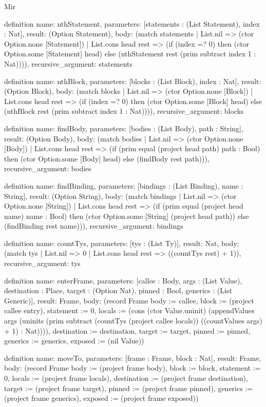 \begin{lexlean}{Mir}
\begin{semanticmodule}
definition{
  name: nthStatement,
  parameters: [statements : (List Statement), index : Nat],
  result: (Option Statement),
  body: (match statements
    | List.nil => (ctor Option.none [Statement])
    | List.cons head rest => (if (index =? 0) then (ctor Option.some [Statement] head) else (nthStatement rest (prim subtract index 1 : Nat)))),
  recursive_argument: statements
}

definition{
  name: nthBlock,
  parameters: [blocks : (List Block), index : Nat],
  result: (Option Block),
  body: (match blocks
    | List.nil => (ctor Option.none [Block])
    | List.cons head rest => (if (index =? 0) then (ctor Option.some [Block] head) else (nthBlock rest (prim subtract index 1 : Nat)))),
  recursive_argument: blocks
}

definition{
  name: findBody,
  parameters: [bodies : (List Body), path : String],
  result: (Option Body),
  body: (match bodies
    | List.nil => (ctor Option.none [Body])
    | List.cons head rest => (if (prim equal (project head path) path : Bool) then (ctor Option.some [Body] head) else (findBody rest path))),
  recursive_argument: bodies
}

definition{
  name: findBinding,
  parameters: [bindings : (List Binding), name : String],
  result: (Option String),
  body: (match bindings
    | List.nil => (ctor Option.none [String])
    | List.cons head rest => (if (prim equal (project head name) name : Bool) then (ctor Option.some [String] (project head path)) else (findBinding rest name))),
  recursive_argument: bindings
}

definition{
  name: countTys,
  parameters: [tys : (List Ty)],
  result: Nat,
  body: (match tys | List.nil => 0 | List.cons head rest => ((countTys rest) + 1)),
  recursive_argument: tys
}

definition{
  name: enterFrame,
  parameters: [callee : Body, args : (List Value), destination : Place, target : (Option Nat), pinned : Bool, generics : (List Generic)],
  result: Frame,
  body: (record Frame {body := callee, block := (project callee entry), statement := 0, locals := (cons (ctor Value.uninit) (appendValues args (uninits (prim subtract (countTys (project callee locals)) ((countValues args) + 1) : Nat)))), destination := destination, target := target, pinned := pinned, generics := generics, exposed := (nil Value)})
}

definition{
  name: moveTo,
  parameters: [frame : Frame, block : Nat],
  result: Frame,
  body: (record Frame {body := (project frame body), block := block, statement := 0, locals := (project frame locals), destination := (project frame destination), target := (project frame target), pinned := (project frame pinned), generics := (project frame generics), exposed := (project frame exposed)})
}


\end{semanticmodule}
\end{lexlean}
